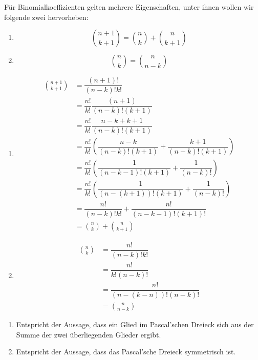 \documentclass[main.tex]{subfiles}
\begin{document}
\begin{Theorem}
  Für Binomialkoeffizienten gelten mehrere Eigenschaften, unter ihnen wollen wir folgende zwei hervorheben:
  \begin{enumerate}
    \item $${n+1 \choose k+1} = {n \choose k}+{n \choose k+1}$$
    \item $${n \choose k} = {n \choose n-k}$$
  \end{enumerate}
\end{Theorem}
\begin{Beweis}
  \begin{enumerate}
    \item \begin{align*}
      {n+1 \choose k+1} &= \dfrac{(n+1)!}{(n-k)!k!}\\
      &= \dfrac{n!}{k!}\dfrac{(n+1)}{(n-k)!(k+1)}\\
      &= \dfrac{n!}{k!}\dfrac{n-k+k+1}{(n-k)!(k+1)}\\
      &= \dfrac{n!}{k!}  \left( \dfrac{n-k}{(n-k)!(k+1)}+\dfrac{k+1}{(n-k)!(k+1)} \right)\\
      &= \dfrac{n!}{k!}  \left( \dfrac{1}{(n-k-1)!(k+1)}+\dfrac{1}{(n-k)!} \right)\\
      &= \dfrac{n!}{k!}  \left( \dfrac{1}{(n-(k+1))!(k+1)}+\dfrac{1}{(n-k)!} \right)\\
      &= \dfrac{n!}{(n-k)!k!}  + \dfrac{n!}{(n-k-1)!(k+1)!}\\
      &= {n \choose k}+{n \choose k+1}
      \end{align*}
    \item \begin{align*}
      {n \choose k}  &= \dfrac{n!}{(n-k)!k!}\\
      &= \dfrac{n!}{k!(n-k)!}\\
      &= \dfrac{n!}{(n-(k-n))!(n-k)!}\\
      &= {n \choose n-k}
    \end{align*}
  \end{enumerate}
\end{Beweis}
\begin{Bemerkung}
  \begin{enumerate}
    \item Entspricht der Aussage, dass ein Glied im Pascal'schen Dreieck sich aus der Summe der zwei überliegenden Glieder ergibt.
    \item Entspricht der Aussage, dass das Pascal'sche Dreieck symmetrisch ist.
  \end{enumerate}
\end{Bemerkung}
\end{document}
